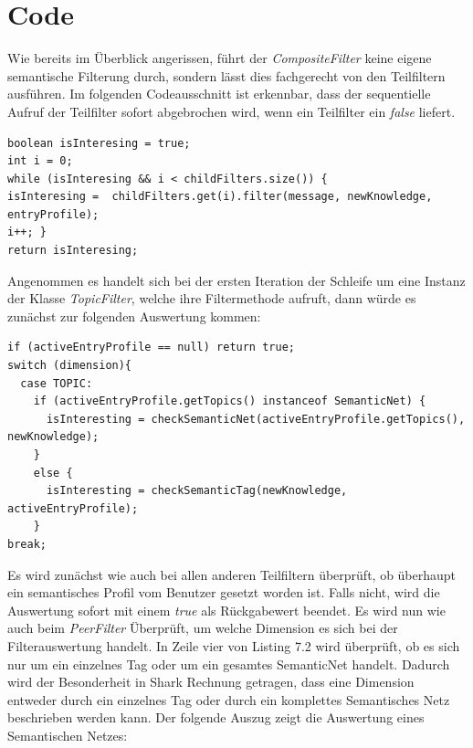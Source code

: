 \section{Code}
Wie bereits im Überblick angerissen, führt der \textit{CompositeFilter} keine eigene semantische Filterung durch, sondern lässt dies fachgerecht von den Teilfiltern ausführen. Im folgenden Codeausschnitt ist erkennbar, dass der sequentielle Aufruf der Teilfilter sofort abgebrochen wird, wenn ein Teilfilter ein \textit{false} liefert.
\lstset{language=Java, caption=Filtermethode im Kompositum, label=DescriptiveLabel, numbers=left, numbersep=1em, breaklines=true, basicstyle=\small}
\begin{lstlisting}
boolean isInteresing = true;
int i = 0;
while (isInteresing && i < childFilters.size()) {
isInteresing =  childFilters.get(i).filter(message, newKnowledge, entryProfile);
i++; }
return isInteresing;
\end{lstlisting}
Angenommen es handelt sich bei der ersten Iteration der Schleife um eine Instanz der Klasse \textit{TopicFilter}, welche ihre Filtermethode aufruft, dann würde es zunächst zur folgenden Auswertung kommen:
\lstset{language=Java, caption=Filtermethode des TopicType Filters (Auszug), label=DescriptiveLabel, numbers=left, numbersep=1em, breaklines=true, basicstyle=\small}
\begin{lstlisting}
if (activeEntryProfile == null) return true;
switch (dimension){
  case TOPIC:
    if (activeEntryProfile.getTopics() instanceof SemanticNet) {
	  isInteresting = checkSemanticNet(activeEntryProfile.getTopics(), newKnowledge);
	}
	else {
	  isInteresting = checkSemanticTag(newKnowledge, activeEntryProfile);
    }
break;
\end{lstlisting}
Es wird zunächst wie auch bei allen anderen Teilfiltern überprüft, ob überhaupt ein semantisches Profil vom Benutzer gesetzt worden ist. Falls nicht, wird die Auswertung sofort mit einem \textit{true} als Rückgabewert beendet. Es wird nun wie auch beim \textit{PeerFilter} Überprüft, um welche Dimension es sich bei der Filterauswertung handelt. In Zeile vier von Listing 7.2 wird überprüft, ob es sich nur um ein einzelnes Tag oder um ein gesamtes SemanticNet handelt. Dadurch wird der Besonderheit in Shark Rechnung getragen, dass eine Dimension entweder durch ein einzelnes Tag oder durch ein komplettes Semantisches Netz beschrieben werden kann. Der folgende Auszug zeigt die Auswertung eines Semantischen Netzes:
\lstset{language=Java, caption=Auswertung des Semantischen Netzes (Auszug), label=DescriptiveLabel, numbers=left, numbersep=1em, breaklines=true, basicstyle=\small}
